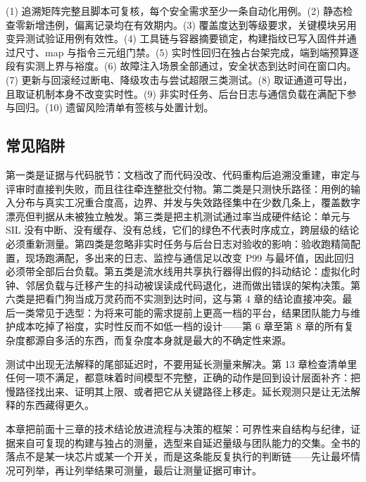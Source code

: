 \documentclass[12pt,a4paper,fontset=fandol]{ctexbook}
\begin{document}
\begin{guideline}[title={上线前逐项签核的验收清单}]
(1) 追溯矩阵完整且脚本可复核，每个安全需求至少一条自动化用例。(2) 静态检查零新增违例，偏离记录均在有效期内。(3) 覆盖度达到等级要求，关键模块另用变异测试验证用例有效性。(4) 工具链与容器摘要锁定，构建指纹已写入固件并通过尺寸、map 与指令三元组门禁。(5) 实时性回归在独占台架完成，端到端预算逐段有实测上界与裕度。(6) 故障注入场景全部通过，安全状态到达时间在窗口内。(7) 更新与回滚经过断电、降级攻击与尝试超限三类测试。(8) 取证通道可导出，且取证机制本身不改变实时性。(9) 非实时任务、后台日志与通信负载在满配下参与回归。(10) 遗留风险清单有签核与处置计划。
\end{guideline}

\subsection{常见陷阱}

第一类是证据与代码脱节：文档改了而代码没改、代码重构后追溯没重建，审定与评审时直接判失败，而且往往牵连整批交付物。第二类是只测快乐路径：用例的输入分布与真实工况重合度高，边界、并发与失效路径集中在少数几条上，覆盖数字漂亮但判据从未被独立触发。第三类是把主机测试通过率当成硬件结论：单元与 SIL 没有中断、没有缓存、没有总线，它们的绿色不代表时序成立，跨层级的结论必须重新测量。第四类是忽略非实时任务与后台日志对验收的影响：验收跑精简配置，现场跑满配，多出来的日志、监控与通信足以改变 P99 与最坏值，因此回归必须带全部后台负载。第五类是流水线用共享执行器得出假的抖动结论：虚拟化时钟、邻居负载与迁移产生的抖动被误读成代码退化，进而做出错误的架构决策。第六类是把看门狗当成万灵药而不实测到达时间，这与第 4 章的结论直接冲突。最后一类常见于选型：为将来可能的需求提前上更高一档的平台，结果团队能力与维护成本吃掉了裕度，实时性反而不如低一档的设计——第 6 章至第 8 章的所有复杂度都源自多活的东西，而复杂度本身就是最大的不确定性来源。

\begin{note}[title={把不可界当成需求缺陷处理}]
测试中出现无法解释的尾部延迟时，不要用延长测量来解决。第 13 章检查清单里任何一项不满足，都意味着时间模型不完整，正确的动作是回到设计层面补齐：把慢路径找出来、证明其上限、或者把它从关键路径上移走。延长观测只是让无法解释的东西藏得更久。
\end{note}

本章把前面十三章的技术结论放进流程与决策的框架：可界性来自结构与纪律，证据来自可复现的构建与独占的测量，选型来自延迟量级与团队能力的交集。全书的落点不是某一块芯片或某一个开关，而是这条能反复执行的判断链——先让最坏情况可列举，再让列举结果可测量，最后让测量证据可审计。
\end{document}
